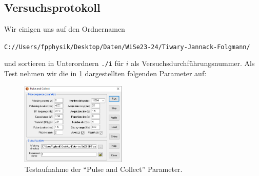 \documentclass{subfiles}
\begin{document}
    \subsection*{Versuchsprotokoll} 
        Wir einigen uns auf den Ordnernamen 
        \begin{center}
            \texttt{C://Users/fpphysik/Desktop/Daten/WiSe23-24/Tiwary-Jannack-Folgmann/}
        \end{center}
        und sortieren in Unterordnern \texttt{./i} für $i$ als Versuchsdurchführungsnummer. Als Test nehmen wir die in \ref{fig:TestPulseAndCollect} dargestellten folgenden Parameter auf:
        \begin{figure}[H]
            \centering
            \includegraphics[width=5cm]{Live-Dokumente/Bilder/Testaufnahme-Pulse-And-Collect.PNG}
            \caption{Testaufnahme der \enquote{Pulse and Collect} Parameter.}
            \label{fig:TestPulseAndCollect}
        \end{figure}
\end{document}
